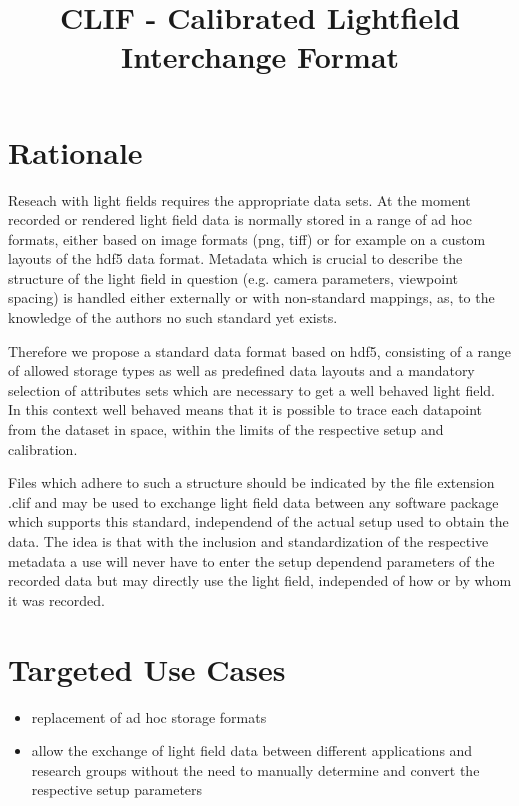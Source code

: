 \documentclass[a4paper,10pt]{article}
\title{CLIF - Calibrated Lightfield Interchange Format}
\author{}
\date{}
\begin{document}
\maketitle

\section{Rationale}

Reseach with light fields requires the appropriate data sets. At the moment recorded or rendered light field data is normally stored in a range of ad hoc formats, either based on image formats (png, tiff) or for example on a custom layouts of the hdf5 data format. Metadata which is crucial to describe the structure of the light field in question (e.g. camera parameters, viewpoint spacing) is handled either externally or with non-standard mappings, as, to the knowledge of the authors no such standard yet exists.

Therefore we propose a standard data format based on hdf5, consisting of a range of allowed storage types as well as predefined data layouts and a mandatory selection of attributes sets which are necessary to get a well behaved light field. In this context well behaved means that it is possible to trace each datapoint from the dataset in space, within the limits of the respective setup and calibration.

Files which adhere to such a structure should be indicated by the file extension .clif and may be used to exchange light field data between any software package which supports this standard, independend of the actual setup used to obtain the data. The idea is that with the inclusion and standardization of the respective metadata a use will never have to enter the setup dependend parameters of the recorded data but may directly use the light field, independed of how or by whom it was recorded.

\section{Targeted Use Cases}

\begin{itemize}
 \item replacement of ad hoc storage formats
 \item allow the exchange of light field data between different applications and research groups without the need to manually determine and convert the respective setup parameters
\end{itemize}
\end{document}
